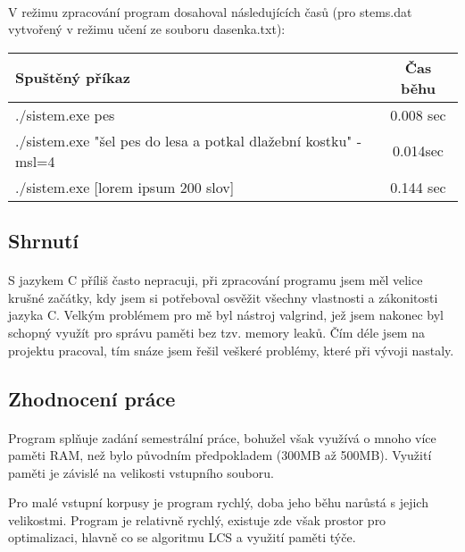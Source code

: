 ﻿\documentclass[12pt, a4paper]{article}
\begin{document}
\paragraph{}
V režimu zpracování program dosahoval následujících časů (pro stems.dat vytvořený v režimu učení ze souboru dasenka.txt):

\begin{center}
 \begin{tabular}{||l | c  ||} 
 \hline
 Spuštěný příkaz & Čas běhu  \\
 \hline\hline
 ./sistem.exe pes & 0.008 sec \\ 
 \hline
 ./sistem.exe "šel pes do lesa a potkal dlažební kostku" -msl=4 & 0.014sec \\ 
 \hline
 ./sistem.exe [lorem ipsum 200 slov] & 0.144 sec \\ 
 \hline
\end{tabular}
\end{center}

\subsection{Shrnutí}
\paragraph{}
S jazykem C příliš často nepracuji, při zpracování programu jsem měl velice krušné začátky, kdy jsem si potřeboval osvěžit všechny vlastnosti a zákonitosti jazyka C. Velkým problémem pro mě byl nástroj valgrind, jež jsem nakonec byl schopný využít pro správu paměti bez tzv. memory leaků. Čím déle jsem na projektu pracoval, tím snáze jsem řešil veškeré problémy, které při vývoji nastaly.

\subsection{Zhodnocení práce}
\paragraph{}
Program splňuje zadání semestrální práce, bohužel však využívá o mnoho více paměti RAM, než bylo původním předpokladem (300MB až 500MB). Využití paměti je závislé na velikosti vstupního souboru.

Pro malé vstupní korpusy je program rychlý, doba jeho běhu narůstá s jejich velikostmi. Program je relativně rychlý, existuje zde však prostor pro optimalizaci, hlavně co se algoritmu LCS a využití paměti týče.


\newpage
\listoffigures
\end{document}
